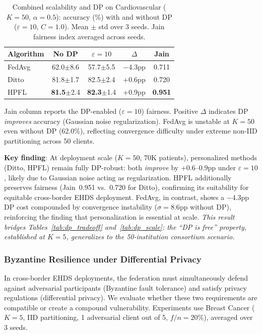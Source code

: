 \documentclass[conference]{IEEEtran}
\begin{document}
\begin{table}[htbp]
\centering
\caption{Combined scalability and DP on Cardiovascular ($K{=}50$, $\alpha{=}0.5$): accuracy (\%) with and without DP ($\varepsilon{=}10$, $C{=}1.0$). Mean $\pm$ std over 3 seeds. Jain fairness index averaged across seeds.}
\label{tab:dp_scale_cv}
\small
\begin{tabular}{lcccc}
\toprule
\textbf{Algorithm} & \textbf{No DP} & \textbf{$\varepsilon{=}10$} & \textbf{$\Delta$} & \textbf{Jain} \\
\midrule
FedAvg & 62.0{\tiny$\pm$8.6} & 57.7{\tiny$\pm$5.5} & $-$4.3pp & 0.711 \\
Ditto & 81.8{\tiny$\pm$1.7} & 82.5{\tiny$\pm$2.4} & +0.6pp & 0.720 \\
HPFL & \textbf{81.5}{\tiny$\pm$2.4} & \textbf{82.3}{\tiny$\pm$1.4} & +0.9pp & \textbf{0.951} \\
\bottomrule
\end{tabular}

\vspace{1mm}
\footnotesize{Jain column reports the DP-enabled ($\varepsilon{=}10$) fairness. Positive $\Delta$ indicates DP \textit{improves} accuracy (Gaussian noise regularization). FedAvg is unstable at $K{=}50$ even without DP (62.0\%), reflecting convergence difficulty under extreme non-IID partitioning across 50 clients.}
\end{table}

\textbf{Key finding}: At deployment scale ($K{=}50$, 70K patients), personalized methods (Ditto, HPFL) remain fully DP-robust: both \textit{improve} by +0.6--0.9pp under $\varepsilon{=}10$, likely due to Gaussian noise acting as regularization. HPFL additionally preserves fairness (Jain~0.951 vs.\ 0.720 for Ditto), confirming its suitability for equitable cross-border EHDS deployment. FedAvg, in contrast, shows a $-$4.3pp DP cost compounded by convergence instability ($\sigma{=}8.6$pp without DP), reinforcing the finding that personalization is essential at scale. \textit{This result bridges Tables~\ref{tab:dp_tradeoff} and~\ref{tab:dp_scale}: the ``DP is free'' property, established at $K{=}5$, generalizes to the 50-institution consortium scenario.}

\subsubsection{Byzantine Resilience under Differential Privacy}\label{sec:byzantine_dp}

In cross-border EHDS deployments, the federation must simultaneously defend against adversarial participants (Byzantine fault tolerance) and satisfy privacy regulations (differential privacy). We evaluate whether these two requirements are compatible or create a compound vulnerability. Experiments use Breast Cancer ($K{=}5$, IID partitioning, 1 adversarial client out of 5, $f/n{=}20\%$), averaged over 3 seeds.
\end{document}
